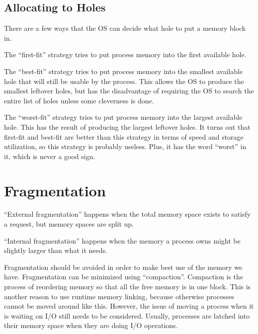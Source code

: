 \documentclass{article}
\begin{document}
\subsection{Allocating to Holes}
There are a few ways that the OS can decide what hole to put a memory block in.

The ``first-fit'' strategy tries to put process memory into the first available
hole.

The ``best-fit'' strategy tries to put process memory into the smallest
available hole that will still be usable by the process. This allows the OS to
produce the smallest leftover holes, but has the disadvantage of requiring the
OS to search the entire list of holes unless some cleverness is done.

The ``worst-fit'' strategy tries to put process memory into the largest
available hole. This has the result of producing the largest leftover holes.
It turns out that first-fit and best-fit are better than this strategy in terms
of speed and storage utilization, so this strategy is probably useless. Plus,
it has the word ``worst'' in it, which is never a good sign.

\section{Fragmentation}
``External fragmentation'' happens when the total memory space exists to
satisfy a request, but memory spaces are split up.

``Internal fragmentation'' happens when the memory a process owns might be
slightly larger than what it needs.

Fragmentation should be avoided in order to make best use of the memory we
have. Fragmentation can be minimized using ``compaction''. Compaction is the
process of reordering memory so that all the free memory is in one block. This
is another reason to use runtime memory linking, because otherwise processes
cannot be moved around like this. However, the issue of moving a process when
it is waiting on I/O still needs to be considered. Usually, processes are
latched into their memory space when they are doing I/O operations.
\end{document}
